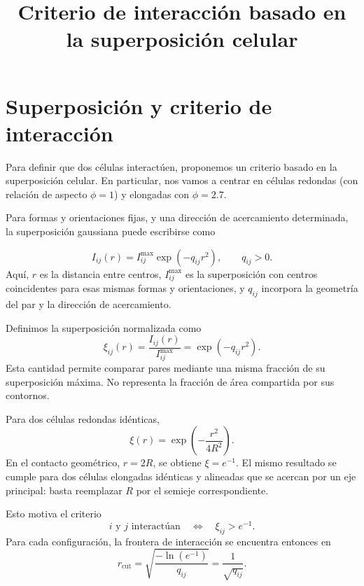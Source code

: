 \documentclass[a4paper,11pt]{article}
\title{Criterio de interacción basado en la superposición celular}
\author{}
\date{}
\begin{document}
	
	\maketitle
	
	\section{Superposición y criterio de interacción}
	
	Para definir que dos células interactúen, proponemos un criterio basado en la superposición celular. En particular, nos vamos a centrar en células redondas (con relación de aspecto $\phi=1$) y elongadas con $\phi=2.7$.
	
	Para formas y orientaciones fijas, y una dirección de acercamiento determinada, la superposición gaussiana puede escribirse como
	
	\begin{equation}
		I_{ij}(r)
		=
		I_{ij}^{\max}
		\exp\left(-q_{ij}r^2\right),
		\qquad q_{ij}>0.
	\end{equation}
	Aquí, $r$ es la distancia entre centros,
	$I_{ij}^{\max}$ es la superposición con centros coincidentes
	para esas mismas formas y orientaciones, y $q_{ij}$
	incorpora la geometría del par y la dirección de acercamiento.
	
	Definimos la superposición normalizada como
	\begin{equation}
		\xi_{ij}(r)
		=
		\frac{I_{ij}(r)}{I_{ij}^{\max}}
		=
		\exp\left(-q_{ij}r^2\right).
	\end{equation}
	Esta cantidad permite comparar pares mediante una misma
	fracción de su superposición máxima. No representa la
	fracción de área compartida por sus contornos.
	
	Para dos células redondas idénticas,
	\begin{equation}
		\xi(r)
		=
		\exp\left(-\frac{r^2}{4R^2}\right).
	\end{equation}
	En el contacto geométrico, $r=2R$, se obtiene
	$\xi=e^{-1}$. El mismo resultado se cumple para dos células
	elongadas idénticas y alineadas que se acercan por un eje
	principal: basta reemplazar $R$ por el semieje correspondiente.
	
	Esto motiva el criterio
	\begin{equation}
		\boxed{
			i \text{ y } j \text{ interactúan}
			\quad\Longleftrightarrow\quad
			\xi_{ij}>e^{-1}.
		}
		\label{eq:interaction}
	\end{equation}
	Para cada configuración, la frontera de interacción se
	encuentra entonces en
	\begin{equation}
		r_{\mathrm{cut}}
		=
		\sqrt{\frac{-\ln(e^{-1})}{q_{ij}}}
		=
		\frac{1}{\sqrt{q_{ij}}}.
	\end{equation}
	
\end{document}
